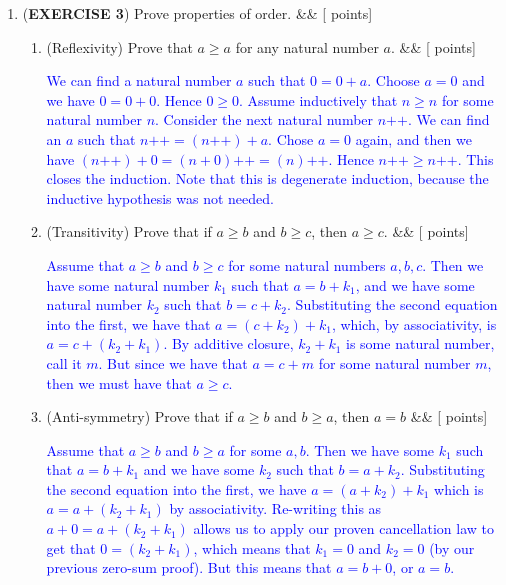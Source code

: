 \documentclass[12pt]{article}
\newcommand{\points}[1]{\hfill {[#1 points]}}
\newcommand{\problem}[2][]{%
  \item {#2}%
  \ifx&#1&%
  \else%
    \points{#1}%
  \fi
  \par\vspace{0.5em}
}
\begin{document}
\begin{enumerate}[leftmargin=*, label=\textbf{\arabic*.}]
	\problem{(\textbf{EXERCISE 3}) Prove properties of order.}
	\begin{enumerate}
	   \problem{(Reflexivity) Prove that $a \geq a$ for any natural number $a$.}
    	\textcolor{blue}{We can find a natural number $a$ such that $0 = 0 + a$. Choose $a=0$ and we have $0 = 0+0$. Hence $0 \geq 0$. Assume inductively that $n \geq n$ for some natural number $n$. Consider the next natural number $n\text{++}$. We can find an $a$ such that $n\text{++} = (n\text{++}) + a$. Chose $a=0$ again, and then we have $(n\text{++}) + 0 = (n+0)\text{++} = (n)\text{++}$. Hence $n\text{++} \geq n\text{++}$. This closes the induction. Note that this is degenerate induction, because the inductive hypothesis was not needed.}
	   \problem{(Transitivity) Prove that if $a \geq b$ and $b \geq c$, then $a \geq c$.}
    	\textcolor{blue}{Assume that $a \geq b$ and $b \geq c$ for some natural numbers $a,b,c$. Then we have some natural number $k_1$ such that $a = b + k_1$, and we have some natural number $k_2$ such that $b = c + k_2$. Substituting the second equation into the first, we have that $a = (c + k_2) + k_1$, which, by associativity, is $a = c + (k_2 + k_1)$. By additive closure, $k_2 + k_1$ is some natural number, call it $m$. But since we have that $a = c + m$ for some natural number $m$, then we must have that $a \geq c$.}
	
	\problem{(Anti-symmetry) Prove that if $a \geq b$ and $b \geq a$, then $a = b$}
	\textcolor{blue}{Assume that $a \geq b$ and $b \geq a$ for some $a,b$. Then we have some $k_1$ such that $a = b + k_1$ and we have some $k_2$ such that $b = a + k_2$. Substituting the second equation into the first, we have $a = (a + k_2) + k_1$ which is $a = a + (k_2 + k_1)$ by associativity. Re-writing this as $a + 0 = a + (k_2 + k_1)$ allows us to apply our proven cancellation law to get that $0 = (k_2 + k_1)$, which means that $k_1 = 0$ and $k_2 = 0$ (by our previous zero-sum proof). But this means that $a=b+0$, or $a=b$.}
	

\end{enumerate}
\end{enumerate}
\end{document}

